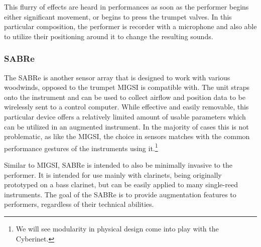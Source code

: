 This flurry of effects are heard in performances as soon as the performer begins either significant movement, or begins to press the trumpet valves. In this particular composition, the performer is recorder with a microphone and also able to utilize their positioning around it to change the resulting sounds.



\subsubsection{SABRe}

The SABRe is another sensor array that is designed to work with various woodwinds, opposed to the trumpet MIGSI is compatible with. The unit straps onto the instrument and can be used to collect airflow and position data to be wirelessly sent to a control computer. While effective and easily removable, this particular device offers a relatively limited amount of usable parameters which can be utilized in an augmented instrument. In the majority of cases this is not problematic, as like the MIGSI, the choice in sensors matches with the common performance gestures of the instruments using it.\footnote{We will see modularity in physical design come into play with the Cyberinet.}

Similar to MIGSI, SABRe is intended to also be minimally invasive to the performer. It is intended for use mainly with clarinets, being originally prototyped on a bass clarinet, but can be easily applied to many single-reed instruments.\cite{Schiesser2012} The goal of the SABRe is to provide augmentation features to performers, regardless of their technical abilities\cite{Schiesser2012}.

